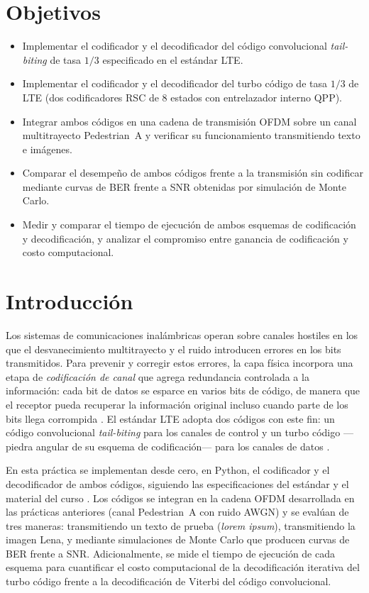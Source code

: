 \documentclass[conference,onecolumn]{IEEEtran}
\begin{document}
\section*{Objetivos}
\begin{itemize}
    \item Implementar el codificador y el decodificador del código convolucional \textit{tail-biting}
          de tasa $1/3$ especificado en el estándar LTE.
    \item Implementar el codificador y el decodificador del turbo código de tasa $1/3$ de LTE
          (dos codificadores RSC de 8 estados con entrelazador interno QPP).
    \item Integrar ambos códigos en una cadena de transmisión OFDM sobre un canal multitrayecto
          Pedestrian~A y verificar su funcionamiento transmitiendo texto e imágenes.
    \item Comparar el desempeño de ambos códigos frente a la transmisión sin codificar mediante
          curvas de BER frente a SNR obtenidas por simulación de Monte Carlo.
    \item Medir y comparar el tiempo de ejecución de ambos esquemas de codificación y
          decodificación, y analizar el compromiso entre ganancia de codificación y costo
          computacional.
\end{itemize}


\section{Introducción}

Los sistemas de comunicaciones inalámbricas operan sobre canales hostiles en los que el
desvanecimiento multitrayecto y el ruido introducen errores en los bits transmitidos. Para
prevenir y corregir estos errores, la capa física incorpora una etapa de \emph{codificación de
canal} que agrega redundancia controlada a la información: cada bit de datos se esparce en varios
bits de código, de manera que el receptor pueda recuperar la información original incluso cuando
parte de los bits llega corrompida \cite{dahlman2014}. El estándar LTE adopta dos códigos con este
fin: un código convolucional \textit{tail-biting} para los canales de control y un turbo código
---piedra angular de su esquema de codificación--- para los canales de datos \cite{ts36212}.

En esta práctica se implementan desde cero, en Python, el codificador y el decodificador de ambos
códigos, siguiendo las especificaciones del estándar y el material del curso \cite{vazquez2024}.
Los códigos se integran en la cadena OFDM desarrollada en las prácticas anteriores (canal
Pedestrian~A \cite{itu1225} con ruido AWGN) y se evalúan de tres maneras: transmitiendo un texto de
prueba (\textit{lorem ipsum}), transmitiendo la imagen Lena, y mediante simulaciones de Monte
Carlo que producen curvas de BER frente a SNR. Adicionalmente, se mide el tiempo de ejecución de
cada esquema para cuantificar el costo computacional de la decodificación iterativa del turbo
código frente a la decodificación de Viterbi del código convolucional.
\end{document}

